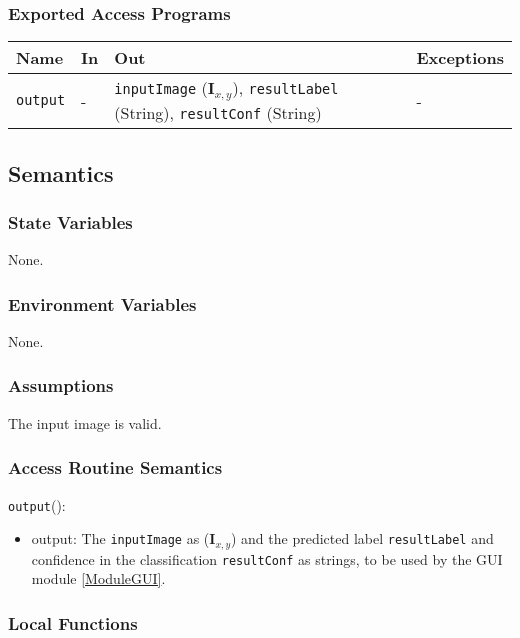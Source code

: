 \documentclass[12pt, titlepage]{article}
\def\code#1{\texttt{#1}}
\begin{document}
\subsubsection{Exported Access Programs}

\begin{center}
\begin{tabular}{p{2cm} p{4cm} p{4cm} p{2cm}}
\hline
\textbf{Name} & \textbf{In} & \textbf{Out} & \textbf{Exceptions} \\
\hline
\code{output} & - & \code{inputImage} ($\mathbf{I}_{x,y}$), \code{resultLabel} (String), \code{resultConf} (String) & - \\
\hline
\end{tabular}
\end{center}

\subsection{Semantics}

\subsubsection{State Variables}

None.

\subsubsection{Environment Variables}

None.

\subsubsection{Assumptions}

The input image is valid.

\subsubsection{Access Routine Semantics}

\noindent \code{output}():
\begin{itemize}
\item output: The \code{inputImage} as ($\mathbf{I}_{x,y}$) and the predicted label \code{resultLabel} and
 confidence in the classification \code{resultConf} as strings, to be used by the GUI module \ref{ModuleGUI}.
\end{itemize}

\subsubsection{Local Functions}
\end{document}
